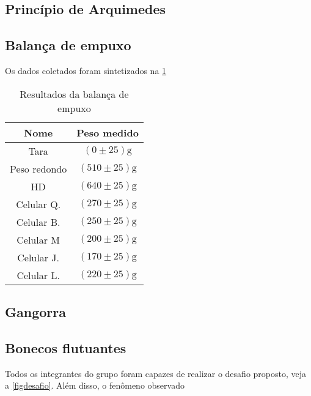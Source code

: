 \subsection{Princípio de Arquimedes}


\subsection{Balança de empuxo}

Os dados coletados foram sintetizados na \cref{tab1}
\begin{table}
    \caption{Resultados da balança de empuxo}
    \label{tab1}
    \begin{center}
        \begin{tabular}{c c}
            \hline
            Nome & Peso medido \\
            \hline
            Tara & \( (0 \pm 25) \unit{\gram} \)\\
            Peso redondo & \( (510 \pm 25) \unit{\gram} \)\\
            HD & \( (640 \pm 25) \unit{\gram} \)\\
            Celular Q. & \( (270 \pm 25) \unit{\gram} \)\\
            Celular B. & \( (250 \pm 25) \unit{\gram} \)\\
            Celular M & \( (200 \pm 25) \unit{\gram} \)\\
            Celular J. & \( (170 \pm 25) \unit{\gram} \)\\
            Celular L. & \( (220 \pm 25) \unit{\gram} \)\\
            \hline
    \end{tabular}
    \end{center}
\end{table}

\subsection{Gangorra}


\subsection{Bonecos flutuantes}

Todos os integrantes do grupo foram capazes de realizar o desafio proposto, veja
a \cref{figdesafio}. Além disso, o fenômeno observado


